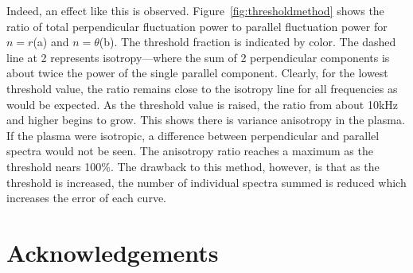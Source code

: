 \documentclass[aip,prl,amsmath,amssymb,reprint,superscriptaddress]{revtex4-1} %
\begin{document}
Indeed, an effect like this is observed. Figure~\ref{fig:thresholdmethod} shows the ratio of total perpendicular fluctuation power to parallel fluctuation power for $n = r$(a) and $n = \theta$(b). The threshold fraction is indicated by color. The dashed line at 2 represents isotropy---where the sum of 2 perpendicular components is about twice the power of the single parallel component. Clearly, for the lowest threshold value, the ratio remains close to the isotropy line for all frequencies as would be expected. As the threshold value is raised, the ratio from about 10kHz and higher begins to grow. This shows there is variance anisotropy in the plasma. If the plasma were isotropic, a difference between perpendicular and parallel spectra would not be seen. The anisotropy ratio reaches a maximum as the threshold nears 100\%. The drawback to this method, however, is that as the threshold is increased, the number of individual spectra summed is reduced which increases the error of each curve.

\section*{Acknowledgements}
\end{document}
